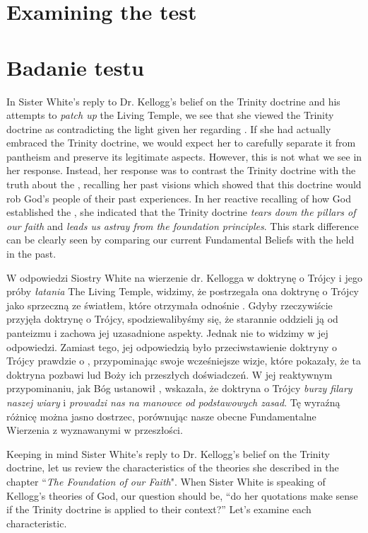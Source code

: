 \chapter{Examining the test}


\chapter{Badanie testu}


In Sister White's reply to Dr. Kellogg's belief on the Trinity doctrine and his attempts to \textit{patch up} the Living Temple, we see that she viewed the Trinity doctrine as contradicting the light given her regarding . If she had actually embraced the Trinity doctrine, we would expect her to carefully separate it from pantheism and preserve its legitimate aspects. However, this is not what we see in her response. Instead, her response was to contrast the Trinity doctrine with the truth about the , recalling her past visions which showed that this doctrine would rob God's people of their past experiences. In her reactive recalling of how God established the , she indicated that the Trinity doctrine \textit{tears down the pillars of our faith} and \textit{leads us astray from the foundation principles}. This stark difference can be clearly seen by comparing our current Fundamental Beliefs with the  held in the past.


W odpowiedzi Siostry White na wierzenie dr. Kellogga w doktrynę o Trójcy i jego próby \textit{łatania} The Living Temple, widzimy, że postrzegała ona doktrynę o Trójcy jako sprzeczną ze światłem, które otrzymała odnośnie . Gdyby rzeczywiście przyjęła doktrynę o Trójcy, spodziewalibyśmy się, że starannie oddzieli ją od panteizmu i zachowa jej uzasadnione aspekty. Jednak nie to widzimy w jej odpowiedzi. Zamiast tego, jej odpowiedzią było przeciwstawienie doktryny o Trójcy prawdzie o , przypominając swoje wcześniejsze wizje, które pokazały, że ta doktryna pozbawi lud Boży ich przeszłych doświadczeń. W jej reaktywnym przypominaniu, jak Bóg ustanowił , wskazała, że doktryna o Trójcy \textit{burzy filary naszej wiary} i \textit{prowadzi nas na manowce od podstawowych zasad}. Tę wyraźną różnicę można jasno dostrzec, porównując nasze obecne Fundamentalne Wierzenia z  wyznawanymi w przeszłości.


Keeping in mind Sister White’s reply to Dr. Kellogg's belief on the Trinity doctrine, let us review the characteristics of the theories she described in the chapter “\textit{The Foundation of our Faith}". When Sister White is speaking of Kellogg’s theories of God, our question should be, “do her quotations make sense if the Trinity doctrine is applied to their context?” Let’s examine each characteristic.


